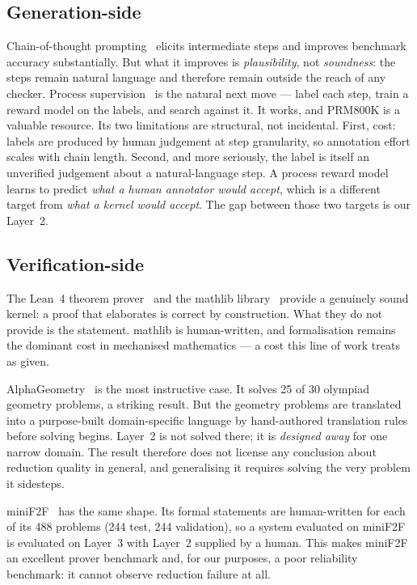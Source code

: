 \documentclass[11pt,a4paper]{article}
\begin{document}
\subsection{Generation-side}
Chain-of-thought prompting~\cite{wei2022chain} elicits intermediate steps and
improves benchmark accuracy substantially.  But what it improves is
\emph{plausibility}, not \emph{soundness}: the steps remain natural language and
therefore remain outside the reach of any checker.  Process
supervision~\cite{lightman2023lets} is the natural next move --- label each step,
train a reward model on the labels, and search against it.  It works, and
PRM800K is a valuable resource.  Its two limitations are structural, not
incidental.  First, cost: labels are produced by human judgement at
step granularity, so annotation effort scales with chain length.  Second, and
more seriously, the label is itself an unverified judgement about a
natural-language step.  A process reward model learns to predict \emph{what a
human annotator would accept}, which is a different target from \emph{what a
kernel would accept}.  The gap between those two targets is our Layer~2.

\subsection{Verification-side}
\label{sec:rw-verify}
The Lean~4 theorem prover~\cite{moura2021lean4} and the mathlib
library~\cite{mathlib2020} provide a genuinely sound kernel: a proof that
elaborates is correct by construction.  What they do not provide is the
statement.  mathlib is human-written, and formalisation remains the dominant
cost in mechanised mathematics --- a cost this line of work treats as given.

AlphaGeometry~\cite{trinh2024alphageometry} is the most instructive case.  It
solves 25 of 30 olympiad geometry problems, a striking result.  But the geometry
problems are translated into a purpose-built domain-specific language by
hand-authored translation rules before solving begins.  Layer~2 is not solved
there; it is \emph{designed away} for one narrow domain.  The result therefore
does not license any conclusion about reduction quality in general, and
generalising it requires solving the very problem it sidesteps.

miniF2F~\cite{zheng2022minif2f} has the same shape.  Its formal statements are
human-written for each of its 488 problems (244 test, 244 validation), so a
system evaluated on miniF2F is evaluated on Layer~3 with Layer~2 supplied by a
human.  This makes miniF2F an excellent prover benchmark and, for our purposes,
a poor reliability benchmark: it cannot observe reduction failure at all.
\end{document}
